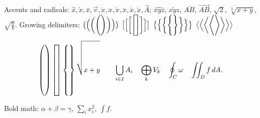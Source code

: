 \documentclass[11pt]{article}
\begin{document}
Accents and radicals:
$\hat{x}, \tilde{x}, \bar{x}, \vec{v}, \dot{x}, \ddot{x}, \check{x}, \breve{x},
\acute{x}, \grave{x}, \hat{A}$; $\widehat{xyz}$, $\widetilde{xyz}$,
$\overline{AB}$, $\overrightarrow{AB}$, $\sqrt{2}$, $\sqrt[3]{x+y}$,
$\sqrt{\frac{a}{b}}$.
Growing delimiters:
$\bigl(\Bigl(\biggl(\Biggl( \Biggr)\biggr)\Bigr)\bigr)$
$\bigl[\Bigl[\biggl[\Biggl[ \Biggr]\biggr]\Bigr]\bigr]$
$\bigl\{\Bigl\{\biggl\{\Biggl\{ \Biggr\}\biggr\}\Bigr\}\bigr\}$
$\bigl\langle\Bigl\langle\biggl\langle\Biggl\langle \Biggr\rangle\biggr\rangle\Bigr\rangle\bigr\rangle$
\[
  \left( \rule{0pt}{14mm} \right) \left[ \rule{0pt}{14mm} \right]
  \left\{ \rule{0pt}{14mm} \right\} \sqrt{\rule{0pt}{14mm}x+y}
  \qquad \bigcup_{i\in I} A_i \quad \bigoplus_{k} V_k \quad \oint_C \omega
  \quad \iint_D f \, dA .
\]

Bold math: {\boldmath $\alpha + \beta = \gamma,\ \sum_i x_i^2,\ \int f$}.
\end{document}
